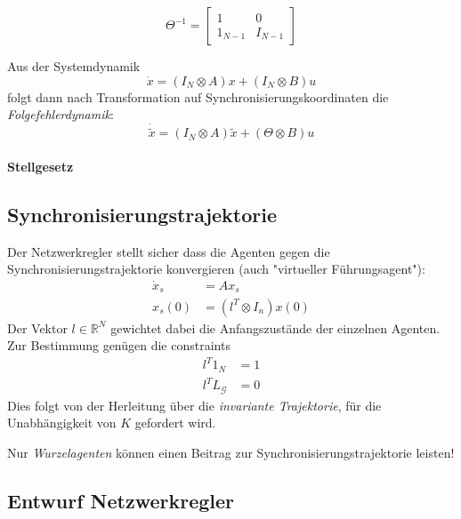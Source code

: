 \begin{equation}
    \Theta^{-1} = \begin{bmatrix}
        1 & 0 \\
        1_{N-1} & I_{N-1}
    \end{bmatrix}    
\end{equation}

Aus der Systemdynamik
\begin{equation}
    \dot{x} = (I_N \otimes A) x + (I_N \otimes B)u
\end{equation}
folgt dann nach Transformation auf Synchronisierungskoordinaten die
\emph{Folgefehlerdynamik}:
\begin{equation}
    \dot{\tilde{x}} = (I_N \otimes A) \tilde{x} + (\Theta \otimes B)u
\end{equation}

\paragraph{Stellgesetz}


\subsection{Synchronisierungstrajektorie}
Der Netzwerkregler stellt sicher dass die Agenten gegen die Synchronisierungstrajektorie
konvergieren (auch "virtueller Führungsagent"):
\begin{align}
    \dot{x}_s &= Ax_s \\
    x_s(0) &= (l^T \otimes I_n) x(0)
\end{align}
Der Vektor $l \in \mathbb{R}^N$ gewichtet dabei die Anfangszustände der einzelnen
Agenten.
Zur Bestimmung genügen die constraints 
\begin{align}
    l^T 1_N &= 1 \\
    l^T L_\mathcal{G} &= 0
\end{align}
Dies folgt von der Herleitung über die \emph{invariante Trajektorie}, für die
Unabhängigkeit von $K$ gefordert wird.

Nur \emph{Wurzelagenten} können einen Beitrag zur 
Synchronisierungstrajektorie leisten!

\subsection{Entwurf Netzwerkregler}

